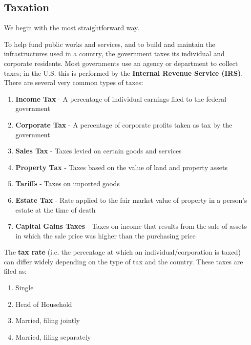 \documentclass{article}
\begin{document}
  \subsection{Taxation}

    We begin with the most straightforward way. 

    \begin{definition}[Taxes]
      To help fund public works and services, and to build and maintain the infrastructures used in a country, the government taxes its individual and corporate residents. Most governments use an agency or department to collect taxes; in the U.S. this is performed by the \textbf{Internal Revenue Service (IRS)}. There are several very common types of taxes: 
      \begin{enumerate}
        \item \textbf{Income Tax} - A percentage of individual earnings filed to the federal government
        \item \textbf{Corporate Tax} - A percentage of corporate profits taken as tax by the government
        \item \textbf{Sales Tax} - Taxes levied on certain goods and services
        \item \textbf{Property Tax} - Taxes based on the value of land and property assets
        \item \textbf{Tariffs} - Taxes on imported goods
        \item \textbf{Estate Tax} - Rate applied to the fair market value of property in a person's estate at the time of death
        \item \textbf{Capital Gains Taxes} - Taxes on income that results from the sale of assets in which the sale price was higher than the purchasing price 
      \end{enumerate}
      The \textbf{tax rate} (i.e. the percentage at which an individual/corporation is taxed) can differ widely depending on the type of tax and the country. These taxes are filed as: 
      \begin{enumerate}
        \item Single
        \item Head of Household
        \item Married, filing jointly
        \item Married, filing separately 
      \end{enumerate}
    \end{definition}
\end{document}
